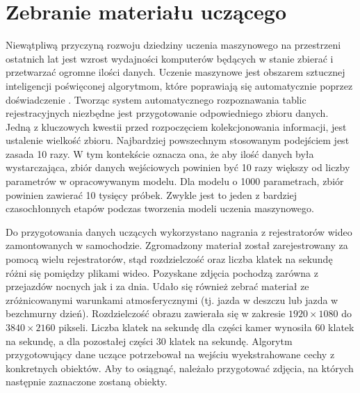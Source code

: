 %



\chapter{Zebranie materiału uczącego}\label{ch:preparing_data_set}

Niewątpliwą przyczyną rozwoju dziedziny uczenia maszynowego na przestrzeni ostatnich lat jest wzrost wydajności komputerów będących w stanie zbierać i przetwarzać ogromne ilości danych.
Uczenie maszynowe jest obszarem sztucznej inteligencji poświęconej algorytmom, które poprawiają się automatycznie poprzez doświadczenie \cite{Mitchell97}.
Tworząc system automatycznego rozpoznawania tablic rejestracyjnych niezbędne jest przygotowanie odpowiedniego zbioru danych.
Jedną z kluczowych kwestii przed rozpoczęciem kolekcjonowania informacji, jest ustalenie wielkość zbioru.
Najbardziej powszechnym stosowanym podejściem jest zasada 10 razy.
W tym kontekście oznacza ona, że aby ilość danych była wystarczająca, zbiór danych wejściowych powinien być 10 razy większy od liczby parametrów w opracowywanym modelu.
Dla modelu o 1000 parametrach, zbiór powinien zawierać 10 tysięcy próbek.
Zwykle jest to jeden z bardziej czasochłonnych etapów podczas tworzenia modeli uczenia maszynowego.

Do przygotowania danych uczących wykorzystano nagrania z rejestratorów wideo zamontowanych w samochodzie.
Zgromadzony materiał został zarejestrowany za pomocą wielu rejestratorów, stąd rozdzielczość oraz liczba klatek na sekundę różni się pomiędzy plikami wideo.
Pozyskane zdjęcia pochodzą zarówna z przejazdów nocnych jak i za dnia.
Udało się również zebrać materiał ze zróżnicowanymi warunkami atmosferycznymi (tj. jazda w deszczu lub jazda w bezchmurny dzień).
Rozdzielczość obrazu zawierała się w zakresie $1920\times 1080$ do $3840\times 2160$ pikseli.
Liczba klatek na sekundę dla części kamer wynosiła 60 klatek na sekundę, a dla pozostałej części 30 klatek na sekundę.
Algorytm przygotowujący dane uczące potrzebował na wejściu wyekstrahowane cechy z konkretnych obiektów.
Aby to osiągnąć, należało przygotować zdjęcia, na których następnie zaznaczone zostaną obiekty.


